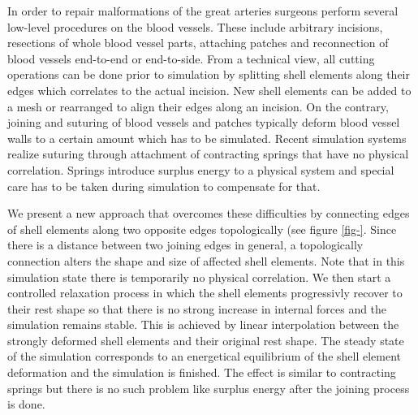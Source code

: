 In order to repair malformations of the great arteries surgeons perform several low-level procedures on the blood vessels. These include arbitrary incisions, resections of whole blood vessel parts, attaching patches and reconnection of blood vessels end-to-end or end-to-side. From a technical view, all cutting operations can be done prior to simulation by splitting shell elements along their edges which correlates to the actual incision. New shell elements can be added to a mesh or rearranged to align their edges along an incision. On the contrary, joining and suturing of blood vessels and patches typically deform blood vessel walls to a certain amount which has to be simulated. Recent simulation systems \cite{} realize suturing through attachment of contracting springs that have no physical correlation. Springs introduce surplus energy to a physical system and special care has to be taken during simulation to compensate for that.

We present a new approach that overcomes these difficulties by connecting edges of shell elements along two opposite edges topologically (see figure \ref{fig-}. Since there is a distance between two joining edges in general, a topologically connection alters the shape and size of affected shell elements. Note that in this simulation state there is temporarily no physical correlation. We then start a controlled relaxation process in which the shell elements progressivly recover to their rest shape so that there is no strong increase in internal forces and the simulation remains stable. This is achieved by linear interpolation between the strongly deformed shell elements and their original rest shape. The steady state of the simulation corresponds to an energetical equilibrium of the shell element deformation and the simulation is finished. The effect is similar to contracting springs but there is no such problem like surplus energy after the joining process is done.




